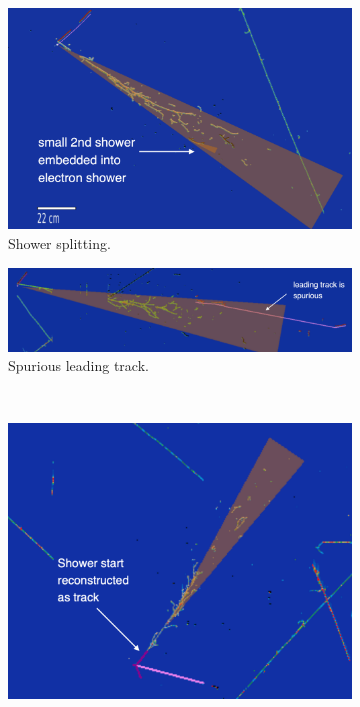 \begin{figure}[H]
    \centering
    \begin{subfigure}{0.30\textwidth}
    \includegraphics[width=1.00\textwidth]{Sidebands/Figures/CutUpdates/split-shower.png}
    \caption{\label{fig:recoveryalgos:split}Shower splitting.}
    \end{subfigure}
    \begin{subfigure}{0.40\textwidth}
    \includegraphics[width=1.00\textwidth]{Sidebands/Figures/CutUpdates/spurious-track.png}
    \caption{\label{fig:recoveryalgos:spurious}Spurious leading track.}
    \end{subfigure} \\
    \begin{subfigure}{0.35\textwidth}
    \includegraphics[width=1.00\textwidth]{Sidebands/Figures/CutUpdates/shr-start-as-track.pdf}

\end{subfigure}
\end{figure}
